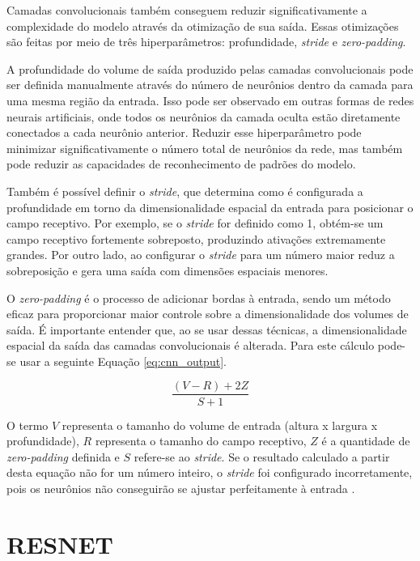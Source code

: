 Camadas convolucionais também conseguem reduzir significativamente a complexidade do modelo através da otimização de sua saída. Essas otimizações são feitas por meio de três hiperparâmetros: profundidade, \textit{stride} e \textit{zero-padding}. 

A profundidade do volume de saída produzido pelas camadas convolucionais pode ser definida manualmente através do número de neurônios dentro da camada para uma mesma região da entrada. Isso pode ser observado em outras formas de redes neurais artificiais, onde todos os neurônios da camada oculta estão diretamente conectados a cada neurônio anterior. Reduzir esse hiperparâmetro pode minimizar significativamente o número total de neurônios da rede, mas também pode reduzir as capacidades de reconhecimento de padrões do modelo. 

Também é possível definir o \textit{stride}, que determina como é configurada a profundidade em torno da dimensionalidade espacial da entrada para posicionar o campo receptivo. Por exemplo, se o \textit{stride} for definido como 1, obtém-se um campo receptivo fortemente sobreposto, produzindo ativações extremamente grandes. Por outro lado, ao configurar o \textit{stride} para um número maior reduz a sobreposição e gera uma saída com dimensões espaciais menores.  

O \textit{zero-padding} é o processo de adicionar bordas à entrada, sendo um método eficaz para proporcionar maior controle sobre a dimensionalidade dos volumes de saída. É importante entender que, ao se usar dessas técnicas, a dimensionalidade espacial da saída das camadas convolucionais é alterada. Para este cálculo pode-se usar a seguinte Equação \ref{eq:cnn_output}.

\begin{equation}
\frac{(V - R) + 2Z}{S + 1}
\label{eq:cnn_output}
\end{equation}

O termo $V$ representa o tamanho do volume de entrada (altura x largura x profundidade), $R$ representa o tamanho do campo receptivo, $Z$ é a quantidade de \textit{zero-padding} definida e $S$ refere-se ao \textit{stride}. Se o resultado calculado a partir desta equação não for um número inteiro, o \textit{stride} foi configurado incorretamente, pois os neurônios não conseguirão se ajustar perfeitamente à entrada \cite{osheaIntroductionConvolutionalNeural2015c}.

\section{RESNET}
\label{sec:resnet}

